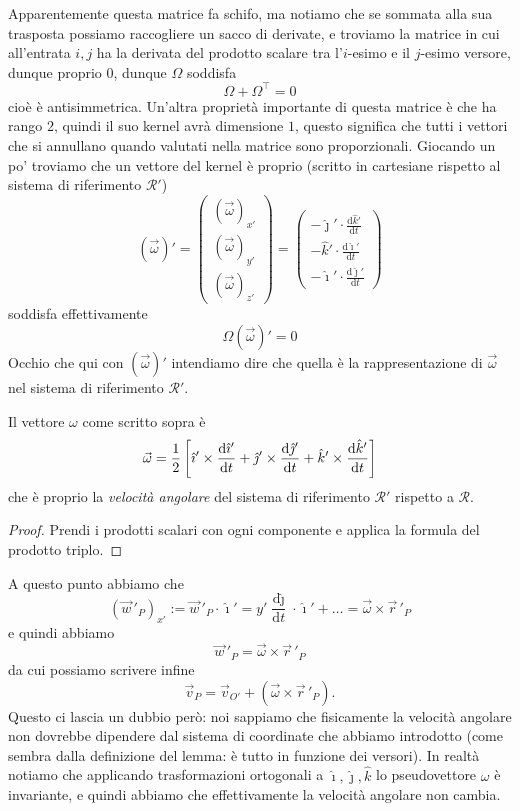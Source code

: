 \documentclass[11pt]{scrartcl}
\newcommand{\dif}{\text{d}}
\newcommand{\ihat}{\hat{\imath}}
\newcommand{\jhat}{\hat{\jmath}}
\newcommand{\khat}{\hat{k}}
\newcommand{\posit}{\vec{r}}
\begin{document}
	Apparentemente questa matrice fa schifo, ma notiamo che se sommata alla sua trasposta possiamo raccogliere un sacco di derivate, e troviamo la matrice in cui all'entrata $i,j$ ha la  derivata del prodotto scalare tra l'$i$-esimo e il $j$-esimo versore, dunque proprio $0$, dunque $\Omega$ soddisfa
	$$\Omega+\Omega^\intercal=0$$
	cioè è antisimmetrica. Un'altra proprietà importante di questa matrice è che ha rango $2$, quindi il suo kernel avrà dimensione $1$, questo significa che tutti i vettori che si annullano quando valutati nella matrice sono proporzionali. Giocando un po' troviamo che un vettore del kernel è proprio (scritto in cartesiane rispetto al sistema di riferimento $\mathcal{R}'$)
	$$(\vec{\omega})'=\begin{pmatrix}
		\left(\vec{\omega}\right)_{x'} \\
		\left(\vec{\omega}\right)_{y'} \\
		\left(\vec{\omega}\right)_{z'} 
	\end{pmatrix}
	=
	\begin{pmatrix}
		-\jhat' \cdot \frac{\dif \khat '}{\dif t} \\
		-\khat' \cdot \frac{\dif \ihat '}{\dif t} \\
		-\ihat' \cdot \frac{\dif \jhat '}{\dif t} 
	\end{pmatrix}
	$$
	soddisfa effettivamente 
	$$\Omega \left(\vec{\omega}\right)'=0$$
	Occhio che qui con $\left(\vec{\omega}\right)'$ intendiamo dire che quella è la rappresentazione di $\vec{\omega}$ nel sistema di riferimento $\mathcal{R}'$.
	\begin{lemma}
		Il vettore $\omega$ come scritto sopra è
		$$\vec{\omega}=\half\left[\ihat'\times \frac{\dif \ihat'}{\dif t}+\jhat'\times \frac{\dif \jhat'}{\dif t}+\khat'\times \frac{\dif \khat'}{\dif t}\right]$$
		che è proprio la \textit{velocità angolare} del sistema di riferimento $\mathcal{R}'$ rispetto a $\mathcal{R}$.
	\end{lemma}
	\begin{proof}
		Prendi i prodotti scalari con ogni componente e applica la formula del prodotto triplo.
	\end{proof}
	
	A questo punto abbiamo che
	$$\left(\vec{w}\,'_P\right)_{x'}:=\vec{w}\,'_P\cdot \ihat'=y'\frac{\dif \jhat}{\dif t}\cdot\ihat'+\dots=\vec{\omega}\times \posit\,'_P$$
	e quindi abbiamo
	$$\vec{w}\,'_P=\vec{\omega}\times \posit\,'_P$$
	da cui possiamo scrivere infine
	$$\vec{v}_P=\vec{v}_{O'}+\left(\vec{\omega}\times \vec{r}\,'_P\right).$$
	Questo ci lascia un dubbio però: noi sappiamo che fisicamente la velocità angolare non dovrebbe dipendere dal sistema di coordinate che abbiamo introdotto (come sembra dalla definizione del lemma: è tutto in funzione dei versori). In realtà notiamo che applicando trasformazioni ortogonali a $\ihat,\jhat,\khat$ lo pseudovettore $\omega$ è invariante, e quindi abbiamo che effettivamente la velocità angolare non cambia. 
\end{document}
